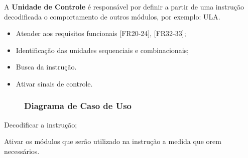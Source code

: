  
    A \textbf{Unidade de Controle} é responsável por definir a partir de uma instrução decodificada o comportamento de outros módulos, 
    por exemplo: ULA. 
  
  \actors
    \begin{description}
    \end{description}
  
  \preconditions 
    \begin{itemize}
     \item Atender aos requisitos funcionais [FR20-24], [FR32-33];
     \item Identificação das unidades sequenciais e combinacionais;
     \item Busca da instrução.
    \end{itemize}

  \postconditions
    \begin{itemize}
      \item Ativar sinais de controle.
    \end{itemize}
  
    \begin{landscape} 
    \begin{figure}
  \subsubsection*{Diagrama de Caso de Uso}
  	
  	\end{figure}
 	\end{landscape}
 
  
  \begin{mainflow}
    \item Decodificar a instrução;
    \item Ativar os módulos que serão utilizado na instrução a medida que orem necessários.
  \end{mainflow}
  
